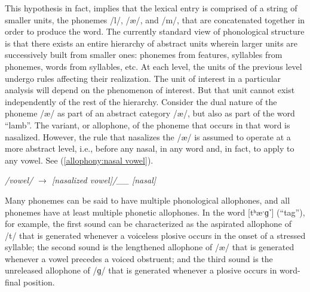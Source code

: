 This hypothesis in fact, implies that the lexical entry is comprised
of a string of smaller units, the phonemes {/l/}, {/æ/},
and {/m/}, that are concatenated together in order to produce
the word. The currently standard view of phonological structure is
that there exists an entire hierarchy of abstract units wherein larger
units are successively built from smaller ones: phonemes from features,
syllables from phonemes, words from syllables, etc. At each level,
the units of the previous level undergo rules affecting their realization.
The unit of interest in a particular analysis will depend on the phenomenon
of interest. But that unit cannot exist independently of the rest
of the hierarchy. Consider the dual nature of the phoneme {/æ/}
as part of an abstract category {/æ/}, but also as part
of the word “lamb”. The variant, or allophone, of the phoneme
that occurs in that word is nasalized. However, the rule that nasalizes
the {/æ/} is assumed to operate at a more abstract level,
i.e., before any nasal, in any word and, in fact, to apply to any
vowel. See (\ref{allophony:nasal vowel}). 
\begin{covexample}
\emph{\label{allophony:nasal vowel}/vowel/ $\rightarrow$ {[}nasalized
vowel{]}/\_\_ {[}nasal{]}}
\end{covexample}
Many phonemes can be said to have multiple phonological allophones,
and all phonemes have at least multiple phonetic allophones. In the
word {[tʰæˑɡ˺}{]} (“tag”), for example, the first
sound can be characterized as the aspirated allophone of {/t/}
that is generated whenever a voiceless plosive occurs in the onset
of a stressed syllable; the second sound is the lengthened allophone
of {/æ/} that is generated whenever a vowel precedes a voiced
obstruent; and the third sound is the unreleased allophone of {/ɡ/}
that is generated whenever a plosive occurs in word-final position. 

